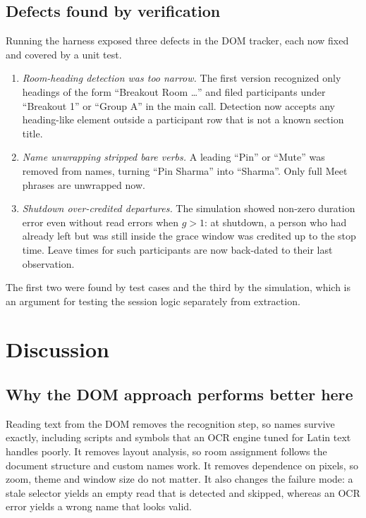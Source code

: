 \documentclass[conference]{IEEEtran}
\begin{document}


\subsection{Defects found by verification}\label{sec:defects}
Running the harness exposed three defects in the DOM tracker, each now fixed and covered by a unit test.
\begin{enumerate}
\item \emph{Room-heading detection was too narrow.} The first version recognized only headings of the form ``Breakout Room \dots'' and filed participants under ``Breakout 1'' or ``Group A'' in the main call. Detection now accepts any heading-like element outside a participant row that is not a known section title.
\item \emph{Name unwrapping stripped bare verbs.} A leading ``Pin'' or ``Mute'' was removed from names, turning ``Pin Sharma'' into ``Sharma''. Only full Meet phrases are unwrapped now.
\item \emph{Shutdown over-credited departures.} The simulation showed non-zero duration error even without read errors when $g>1$: at shutdown, a person who had already left but was still inside the grace window was credited up to the stop time. Leave times for such participants are now back-dated to their last observation.
\end{enumerate}
The first two were found by test cases and the third by the simulation, which is an argument for testing the session logic separately from extraction.

\section{Discussion}\label{sec:discussion}
\subsection{Why the DOM approach performs better here}
Reading text from the DOM removes the recognition step, so names survive exactly, including scripts and symbols that an OCR engine tuned for Latin text handles poorly. It removes layout analysis, so room assignment follows the document structure and custom names work. It removes dependence on pixels, so zoom, theme and window size do not matter. It also changes the failure mode: a stale selector yields an empty read that is detected and skipped, whereas an OCR error yields a wrong name that looks valid.
\end{document}
